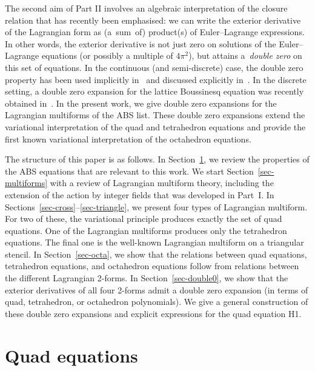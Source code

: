 \documentclass[10pt,a4paper]{amsart}
\numberwithin{equation}{section}
\begin{document}
The second aim of Part II involves an algebraic interpretation of the closure relation that has recently been emphasised: we can write the exterior derivative of the Lagrangian form as (a~sum~of) product(s) of Euler--Lagrange expressions. In other words, the exterior derivative is not just zero on solutions of the Euler--Lagrange equations \big(or possibly a multiple of $4 \pi^2$\big), but attains a~\emph{double zero} on this set of equations.
In the continuous (and semi-discrete) case, the double zero property has been used implicitly in~\cite{sleigh2020variational, suris2016variational} and discussed explicitly in~\mbox{\cite{caudrelier2023lagrangiana, petrera2021variational, sleigh2022semi}}. In the discrete setting, a double zero expansion for the lattice Boussinesq equation was recently obtained in~\cite{nijhoff2024lagrangian}. In the present work, we give double zero expansions for the Lagrangian multiforms of the ABS list.
These double zero expansions extend the variational interpretation of the quad and tetrahedron equations and provide the first known variational interpretation of the octahedron equations.

The structure of this paper is as follows. In Section~\ref{sec-abs}, we review the properties of the ABS equations that are relevant to this work. We start Section~\ref{sec-multiforms} with a review of Lagrangian multiform theory, including the extension of the action by integer fields that was developed in Part~I. In Sections~\ref{sec-cross}--\ref{sec-triangle}, we present four types of Lagrangian multiform. For two of these, the variational principle produces exactly the set of quad equations. One of the Lagrangian multiforms produces only the tetrahedron equations. The final one is the well-known Lagrangian multiform on a triangular stencil. In Section~\ref{sec-octa}, we show that the relations between quad equations, tetrahedron equations, and octahedron equations follow from relations between the different Lagrangian 2-forms. In Section~\ref{sec-double0}, we show that the exterior derivatives of all four 2-forms admit a double zero expansion (in terms of quad, tetrahedron, or octahedron polynomials). We give a general construction of these double zero expansions and explicit expressions for the quad equation H1.


\section{Quad equations}\label{sec-abs}
\end{document}
